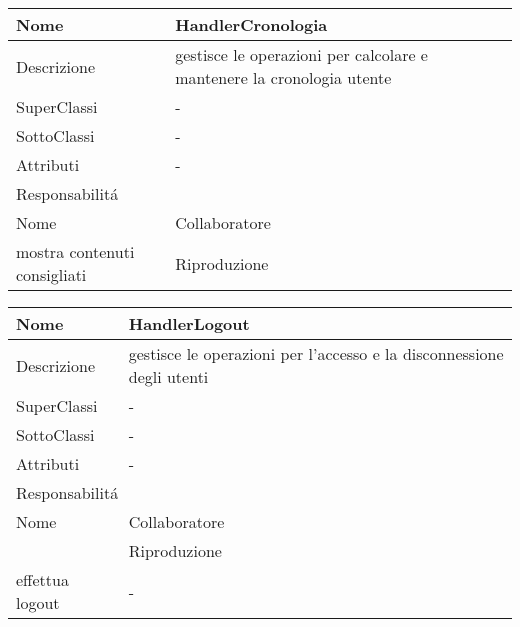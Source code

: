 \begin{center} %
    \begin{longtable}{ |p{3cm}|p{3cm}|p{3cm}|p{3cm}| }
        \hline
        Nome & \multicolumn{3}{|p{9cm}|}{HandlerCronologia} \\\hline
        Descrizione & \multicolumn{3}{|p{9cm}|}{gestisce le operazioni per calcolare e mantenere la cronologia utente} \\\hline
        SuperClassi & \multicolumn{3}{|p{9cm}|}{-} \\\hline
        SottoClassi & \multicolumn{3}{|p{9cm}|}{-} \\\hline
        Attributi & \multicolumn{3}{|p{9cm}|}{-} \\\hline
        \multicolumn{4}{|p{12cm}|}{Responsabilit\'a} \\\hline %
        \multicolumn{2}{|p{6cm}|}{Nome} & \multicolumn{2}{|p{6cm}|}{Collaboratore} \\\hline %
        \multicolumn{2}{|p{6cm}|}{mostra contenuti consigliati} & \multicolumn{2}{|p{6cm}|}{Riproduzione} \\\hline
        \end{longtable}
\end{center}

\begin{center} %
    \begin{longtable}{ |p{3cm}|p{3cm}|p{3cm}|p{3cm}| }
        \hline
        Nome & \multicolumn{3}{|p{9cm}|}{HandlerLogout} \\\hline
        Descrizione & \multicolumn{3}{|p{9cm}|}{gestisce le operazioni per l'accesso e la disconnessione degli utenti} \\\hline
        SuperClassi & \multicolumn{3}{|p{9cm}|}{-} \\\hline
        SottoClassi & \multicolumn{3}{|p{9cm}|}{-} \\\hline
        Attributi & \multicolumn{3}{|p{9cm}|}{-} \\\hline
        \multicolumn{4}{|p{12cm}|}{Responsabilit\'a} \\\hline %
        \multicolumn{2}{|p{6cm}|}{Nome} & \multicolumn{2}{|p{6cm}|}{Collaboratore} \\\hline %
        \multicolumn{2}{|p{6cm}|}{} & \multicolumn{2}{|p{6cm}|}{Riproduzione} \\\hline
        \multicolumn{2}{|p{6cm}|}{effettua logout} & \multicolumn{2}{|p{6cm}|}{-} \\\hline
        \end{longtable}
\end{center}

